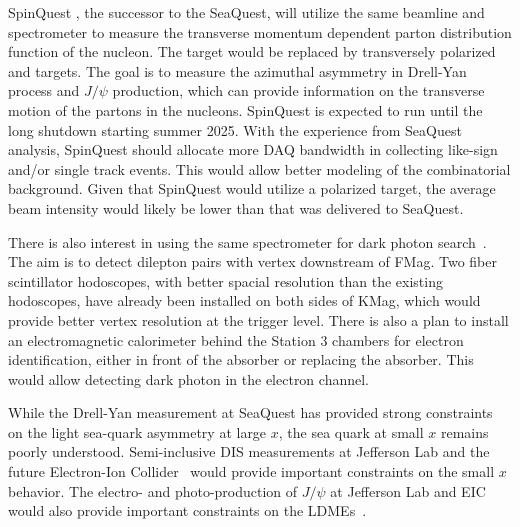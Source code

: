 \documentclass[../main.tex]{subfiles}
\begin{document}
SpinQuest \cite{geesaman2014}, the successor to the SeaQuest, will utilize the same beamline and
spectrometer to measure the transverse momentum dependent parton distribution
function of the nucleon. The target would be replaced by transversely polarized 
and  targets. The goal is to measure the azimuthal asymmetry in
Drell-Yan process and $J/\psi$ production, which can provide information on the
transverse motion of the partons in the nucleons.
SpinQuest is expected to run until the long shutdown starting summer 2025. With the experience
from SeaQuest analysis, SpinQuest should allocate more DAQ bandwidth in collecting
like-sign and/or single track events. This would allow better modeling of the combinatorial
background. Given that SpinQuest would utilize a polarized target,
the average beam intensity would likely be lower than that was delivered to SeaQuest.

There is also interest in using the same spectrometer for dark photon search~\cite{apyan2022}.
The aim is to detect dilepton pairs with vertex downstream of FMag.
Two fiber scintillator hodoscopes, with better spacial resolution than the existing hodoscopes,
have already been installed on both sides of KMag,
which would provide better vertex resolution at the trigger level.
There is also a plan to install an electromagnetic calorimeter behind the
Station 3 chambers for electron identification, either in front of the absorber or replacing the absorber.
This would allow detecting dark photon in the electron
channel.

While the Drell-Yan measurement at SeaQuest has provided strong constraints on the light sea-quark
asymmetry at large $x$, the sea quark at small $x$ remains poorly understood.
Semi-inclusive DIS measurements at Jefferson Lab and the future Electron-Ion Collider~\cite{abdulkhalek2022}
would provide important constraints on the small $x$ behavior. 
The electro- and photo-production of $J/\psi$ at Jefferson Lab and EIC would also provide important
constraints on the LDMEs~\cite{qiu2021}.

\ifSubfilesClassLoaded{ \printbibliography[heading=bibintoc,title={References}]}{}
\end{document}
